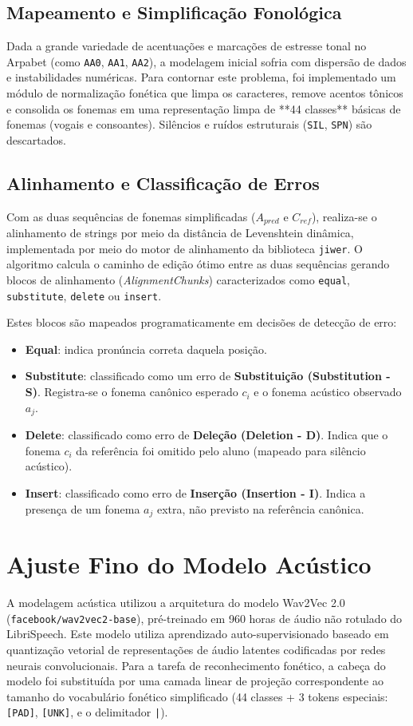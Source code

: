 \documentclass[12pt]{article}
\begin{document}
\subsection{Mapeamento e Simplificação Fonológica}
Dada a grande variedade de acentuações e marcações de estresse tonal no Arpabet (como \texttt{AA0}, \texttt{AA1}, \texttt{AA2}), a modelagem inicial sofria com dispersão de dados e instabilidades numéricas. Para contornar este problema, foi implementado um módulo de normalização fonética que limpa os caracteres, remove acentos tônicos e consolida os fonemas em uma representação limpa de **44 classes** básicas de fonemas (vogais e consoantes). Silêncios e ruídos estruturais (\texttt{SIL}, \texttt{SPN}) são descartados.

\subsection{Alinhamento e Classificação de Erros}
Com as duas sequências de fonemas simplificadas ($A_{pred}$ e $C_{ref}$), realiza-se o alinhamento de strings por meio da distância de Levenshtein dinâmica, implementada por meio do motor de alinhamento da biblioteca \texttt{jiwer}. O algoritmo calcula o caminho de edição ótimo entre as duas sequências gerando blocos de alinhamento (\textit{AlignmentChunks}) caracterizados como \texttt{equal}, \texttt{substitute}, \texttt{delete} ou \texttt{insert}. 

Estes blocos são mapeados programaticamente em decisões de detecção de erro:
\begin{itemize}
    \item \textbf{Equal}: indica pronúncia correta daquela posição.
    \item \textbf{Substitute}: classificado como um erro de \textbf{Substituição (Substitution - S)}. Registra-se o fonema canônico esperado $c_i$ e o fonema acústico observado $a_j$.
    \item \textbf{Delete}: classificado como erro de \textbf{Deleção (Deletion - D)}. Indica que o fonema $c_i$ da referência foi omitido pelo aluno (mapeado para silêncio acústico).
    \item \textbf{Insert}: classificado como erro de \textbf{Inserção (Insertion - I)}. Indica a presença de um fonema $a_j$ extra, não previsto na referência canônica.
\end{itemize}

\section{Ajuste Fino do Modelo Acústico}
A modelagem acústica utilizou a arquitetura do modelo Wav2Vec 2.0 (\texttt{facebook/wav2vec2-base}), pré-treinado em 960 horas de áudio não rotulado do LibriSpeech. Este modelo utiliza aprendizado auto-supervisionado baseado em quantização vetorial de representações de áudio latentes codificadas por redes neurais convolucionais. Para a tarefa de reconhecimento fonético, a cabeça do modelo foi substituída por uma camada linear de projeção correspondente ao tamanho do vocabulário fonético simplificado (44 classes + 3 tokens especiais: \texttt{[PAD]}, \texttt{[UNK]}, e o delimitador \texttt{|}).
\end{document}

